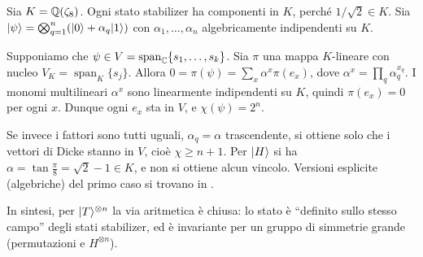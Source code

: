 \begin{remark}\label{rem:arith}
Sia $K=\mathbb Q(\zeta_8)$. Ogni stato stabilizer ha componenti in $K$, perché $1/\sqrt2\in K$. Sia $\lvert \psi\rangle=\bigotimes_{q=1}^n(\lvert 0\rangle+\alpha_q\lvert 1\rangle)$ con $\alpha_1,\dots,\alpha_n$ algebricamente indipendenti su $K$.

Supponiamo che $\psi\in V=\operatorname{span}_\mathbb C\{s_1,\dots,s_k\}$. Sia $\pi$ una mappa $K$-lineare con nucleo $V_K=\operatorname{span}_K\{s_j\}$. Allora $0=\pi(\psi)=\sum_x\alpha^x\pi(e_x)$, dove $\alpha^x=\prod_q\alpha_q^{x_q}$. I monomi multilineari $\alpha^x$ sono linearmente indipendenti su $K$, quindi $\pi(e_x)=0$ per ogni $x$. Dunque ogni $e_x$ sta in $V$, e $\chi(\psi)=2^n$.

Se invece i fattori sono tutti uguali, $\alpha_q=\alpha$ trascendente, si ottiene solo che i vettori di Dicke stanno in $V$, cioè $\chi\ge n+1$. Per $\lvert H\rangle$ si ha $\alpha=\tan\frac\pi8=\sqrt2-1\in K$, e non si ottiene alcun vincolo. Versioni esplicite (algebriche) del primo caso si trovano in \cite{LS22}.

In sintesi, per $\lvert T\rangle^{\otimes n}$ la via aritmetica è chiusa: lo stato è ``definito sullo stesso campo'' degli stati stabilizer, ed è invariante per un gruppo di simmetrie grande (permutazioni e $H^{\otimes n}$).
\end{remark}
